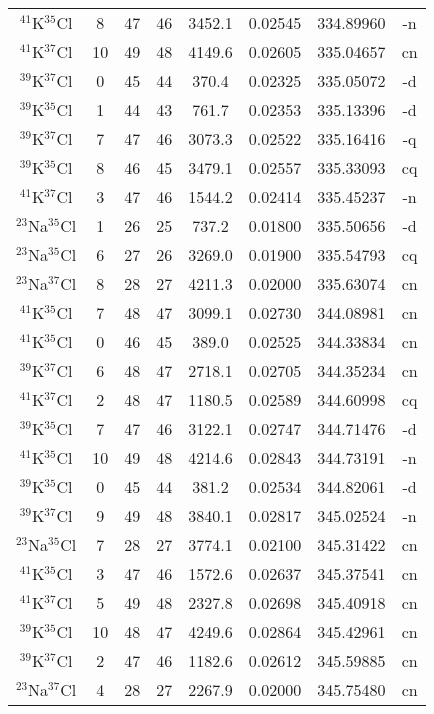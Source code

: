 \begin{table*}[htp]
\begin{tabular}{cccccccc}
$^{41}$K$^{35}$Cl & 8 & 47 & 46 & 3452.1 & 0.02545 & 334.89960 & -n \\
$^{41}$K$^{37}$Cl & 10 & 49 & 48 & 4149.6 & 0.02605 & 335.04657 & cn \\
$^{39}$K$^{37}$Cl & 0 & 45 & 44 & 370.4 & 0.02325 & 335.05072 & -d \\
$^{39}$K$^{35}$Cl & 1 & 44 & 43 & 761.7 & 0.02353 & 335.13396 & -d \\
$^{39}$K$^{37}$Cl & 7 & 47 & 46 & 3073.3 & 0.02522 & 335.16416 & -q \\
$^{39}$K$^{35}$Cl & 8 & 46 & 45 & 3479.1 & 0.02557 & 335.33093 & cq \\
$^{41}$K$^{37}$Cl & 3 & 47 & 46 & 1544.2 & 0.02414 & 335.45237 & -n \\
$^{23}$Na$^{35}$Cl & 1 & 26 & 25 & 737.2 & 0.01800 & 335.50656 & -d \\
$^{23}$Na$^{35}$Cl & 6 & 27 & 26 & 3269.0 & 0.01900 & 335.54793 & cq \\
$^{23}$Na$^{37}$Cl & 8 & 28 & 27 & 4211.3 & 0.02000 & 335.63074 & cn \\
$^{41}$K$^{35}$Cl & 7 & 48 & 47 & 3099.1 & 0.02730 & 344.08981 & cn \\
$^{41}$K$^{35}$Cl & 0 & 46 & 45 & 389.0 & 0.02525 & 344.33834 & cn \\
$^{39}$K$^{37}$Cl & 6 & 48 & 47 & 2718.1 & 0.02705 & 344.35234 & cn \\
$^{41}$K$^{37}$Cl & 2 & 48 & 47 & 1180.5 & 0.02589 & 344.60998 & cq \\
$^{39}$K$^{35}$Cl & 7 & 47 & 46 & 3122.1 & 0.02747 & 344.71476 & -d \\
$^{41}$K$^{35}$Cl & 10 & 49 & 48 & 4214.6 & 0.02843 & 344.73191 & -n \\
$^{39}$K$^{35}$Cl & 0 & 45 & 44 & 381.2 & 0.02534 & 344.82061 & -d \\
$^{39}$K$^{37}$Cl & 9 & 49 & 48 & 3840.1 & 0.02817 & 345.02524 & -n \\
$^{23}$Na$^{35}$Cl & 7 & 28 & 27 & 3774.1 & 0.02100 & 345.31422 & cn \\
$^{41}$K$^{35}$Cl & 3 & 47 & 46 & 1572.6 & 0.02637 & 345.37541 & cn \\
$^{41}$K$^{37}$Cl & 5 & 49 & 48 & 2327.8 & 0.02698 & 345.40918 & cn \\
$^{39}$K$^{35}$Cl & 10 & 48 & 47 & 4249.6 & 0.02864 & 345.42961 & cn \\
$^{39}$K$^{37}$Cl & 2 & 47 & 46 & 1182.6 & 0.02612 & 345.59885 & cn \\
$^{23}$Na$^{37}$Cl & 4 & 28 & 27 & 2267.9 & 0.02000 & 345.75480 & cn \\

\end{tabular}
\end{table*}
